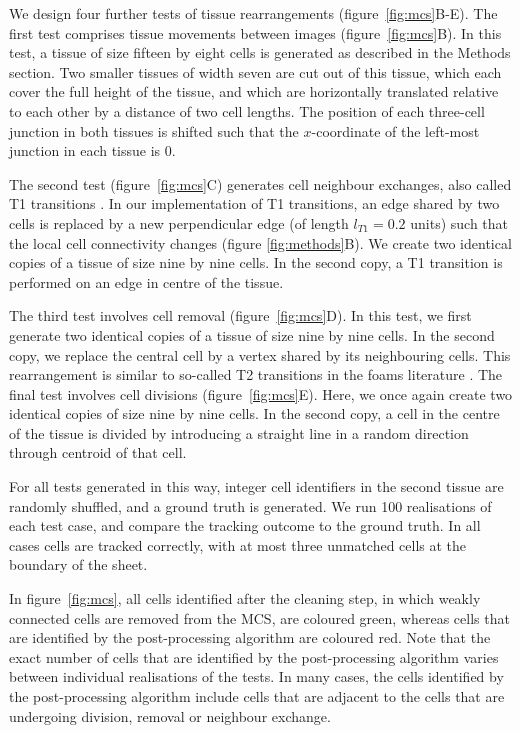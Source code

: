 \documentclass[a4paper,11pt]{article}
\begin{document}

We design four further tests of tissue rearrangements (figure~\ref{fig:mcs}B-E).
The first test comprises tissue movements between images (figure~\ref{fig:mcs}B). 
In this test, a tissue of size fifteen by eight cells is generated as described in the Methods section. 
Two smaller tissues of width seven are cut out of this tissue, which each cover the full height of the tissue, and which are horizontally translated relative to each other by a distance of two cell lengths. 
The position of each three-cell junction in both tissues is shifted such that the $x$-coordinate of the left-most junction in each tissue is 0.

The second test (figure~\ref{fig:mcs}C) generates cell neighbour exchanges, also called T1 transitions \cite{Nagai1988,Etournay2015}. 
In our implementation of T1 transitions, an edge shared by two cells is replaced by a new perpendicular edge (of length $l_{T1} = 0.2$ units) such that the local cell connectivity changes (figure \ref{fig:methods}B). 
We create two identical copies of a tissue of size nine by nine cells. In the second copy, a T1 transition is performed on an edge in centre of the tissue.

The third test involves cell removal (figure~\ref{fig:mcs}D). 
In this test, we first generate two identical copies of a tissue of size nine by nine cells. 
In the second copy, we replace the central cell by a vertex shared by its neighbouring cells. 
This rearrangement is similar to so-called T2 transitions in the foams literature \cite{Nagai1988}.
The final test involves cell divisions (figure~\ref{fig:mcs}E). 
Here, we once again create two identical copies of size nine by nine cells. 
In the second copy, a cell in the centre of the tissue is divided by introducing a straight line in a random direction through centroid of that cell.

For all tests generated in this way, integer cell identifiers in the second tissue are randomly shuffled, and a ground truth is generated. 
We run 100 realisations of each test case, and compare the tracking outcome to the ground truth. 
In all cases cells are tracked correctly, with at most three unmatched cells at the boundary of the sheet.

In figure~\ref{fig:mcs}, all cells identified after the cleaning step, in which weakly connected cells are removed from the MCS, are coloured green, whereas cells that are identified by the post-processing algorithm are coloured red. 
Note that the exact number of cells that are identified by the post-processing algorithm varies between individual realisations of the tests. 
In many cases, the cells identified by the post-processing algorithm include cells that are adjacent to the cells that are undergoing division, removal or neighbour exchange. 
\end{document}
